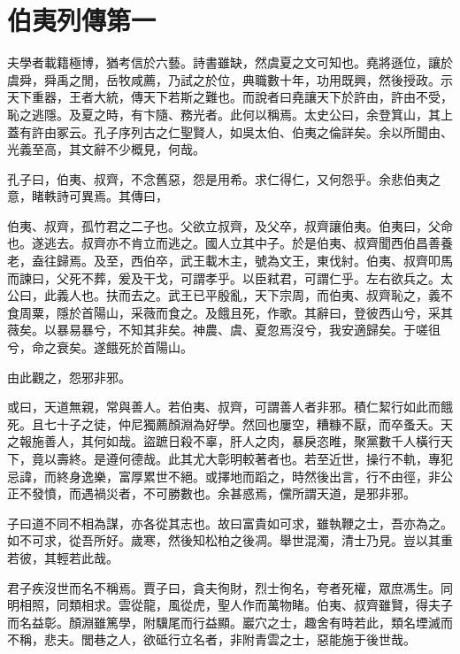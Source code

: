 \chapter{伯夷列傳第一}

夫學者載籍極博，猶考信於六藝。詩書雖缺，然虞夏之文可知也。堯將遜位，讓於虞舜，舜禹之閒，岳牧咸薦，乃試之於位，典職數十年，功用既興，然後授政。示天下重器，王者大統，傳天下若斯之難也。而說者曰堯讓天下於許由，許由不受，恥之逃隱。及夏之時，有卞隨、務光者。此何以稱焉。太史公曰，余登箕山，其上蓋有許由冢云。孔子序列古之仁聖賢人，如吳太伯、伯夷之倫詳矣。余以所聞由、光義至高，其文辭不少概見，何哉。

孔子曰，伯夷、叔齊，不念舊惡，怨是用希。求仁得仁，又何怨乎。余悲伯夷之意，睹軼詩可異焉。其傳曰，

伯夷、叔齊，孤竹君之二子也。父欲立叔齊，及父卒，叔齊讓伯夷。伯夷曰，父命也。遂逃去。叔齊亦不肯立而逃之。國人立其中子。於是伯夷、叔齊聞西伯昌善養老，盍往歸焉。及至，西伯卒，武王載木主，號為文王，東伐紂。伯夷、叔齊叩馬而諫曰，父死不葬，爰及干戈，可謂孝乎。以臣弒君，可謂仁乎。左右欲兵之。太公曰，此義人也。扶而去之。武王已平殷亂，天下宗周，而伯夷、叔齊恥之，義不食周粟，隱於首陽山，采薇而食之。及餓且死，作歌。其辭曰，登彼西山兮，采其薇矣。以暴易暴兮，不知其非矣。神農、虞、夏忽焉沒兮，我安適歸矣。于嗟徂兮，命之衰矣。遂餓死於首陽山。

由此觀之，怨邪非邪。

或曰，天道無親，常與善人。若伯夷、叔齊，可謂善人者非邪。積仁絜行如此而餓死。且七十子之徒，仲尼獨薦顏淵為好學。然回也屢空，糟糠不厭，而卒蚤夭。天之報施善人，其何如哉。盜蹠日殺不辜，肝人之肉，暴戾恣睢，聚黨數千人橫行天下，竟以壽終。是遵何德哉。此其尤大彰明較著者也。若至近世，操行不軌，專犯忌諱，而終身逸樂，富厚累世不絕。或擇地而蹈之，時然後出言，行不由徑，非公正不發憤，而遇禍災者，不可勝數也。余甚惑焉，儻所謂天道，是邪非邪。

子曰道不同不相為謀，亦各從其志也。故曰富貴如可求，雖執鞭之士，吾亦為之。如不可求，從吾所好。歲寒，然後知松柏之後凋。舉世混濁，清士乃見。豈以其重若彼，其輕若此哉。

君子疾沒世而名不稱焉。賈子曰，貪夫徇財，烈士徇名，夸者死權，眾庶馮生。同明相照，同類相求。雲從龍，風從虎，聖人作而萬物睹。伯夷、叔齊雖賢，得夫子而名益彰。顏淵雖篤學，附驥尾而行益顯。巖穴之士，趣舍有時若此，類名堙滅而不稱，悲夫。閭巷之人，欲砥行立名者，非附青雲之士，惡能施于後世哉。